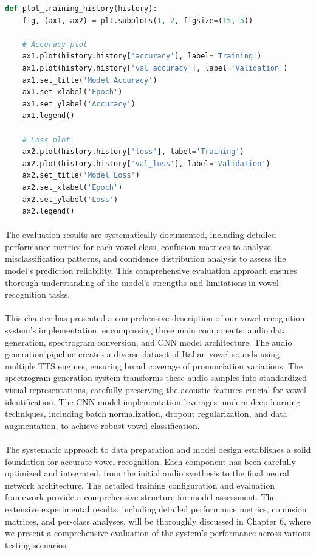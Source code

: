 \begin{lstlisting}[language=Python, caption={Evaluation Visualization Code}]
def plot_training_history(history):
    fig, (ax1, ax2) = plt.subplots(1, 2, figsize=(15, 5))
    
    # Accuracy plot
    ax1.plot(history.history['accuracy'], label='Training')
    ax1.plot(history.history['val_accuracy'], label='Validation')
    ax1.set_title('Model Accuracy')
    ax1.set_xlabel('Epoch')
    ax1.set_ylabel('Accuracy')
    ax1.legend()
    
    # Loss plot
    ax2.plot(history.history['loss'], label='Training')
    ax2.plot(history.history['val_loss'], label='Validation')
    ax2.set_title('Model Loss')
    ax2.set_xlabel('Epoch')
    ax2.set_ylabel('Loss')
    ax2.legend()
\end{lstlisting}

\paragraph{}
The evaluation results are systematically documented, including detailed performance metrics for each vowel class, confusion matrices to analyze misclassification patterns, and confidence distribution analysis to assess the model's prediction reliability. This comprehensive evaluation approach ensures thorough understanding of the model's strengths and limitations in vowel recognition tasks.


\paragraph{}
This chapter has presented a comprehensive description of our vowel recognition system's implementation, encompassing three main components: audio data generation, spectrogram conversion, and CNN model architecture. The audio generation pipeline creates a diverse dataset of Italian vowel sounds using multiple TTS engines, ensuring broad coverage of pronunciation variations. The spectrogram generation system transforms these audio samples into standardized visual representations, carefully preserving the acoustic features crucial for vowel identification. The CNN model implementation leverages modern deep learning techniques, including batch normalization, dropout regularization, and data augmentation, to achieve robust vowel classification.

\paragraph{}
The systematic approach to data preparation and model design establishes a solid foundation for accurate vowel recognition. Each component has been carefully optimized and integrated, from the initial audio synthesis to the final neural network architecture. The detailed training configuration and evaluation framework provide a comprehensive structure for model assessment. The extensive experimental results, including detailed performance metrics, confusion matrices, and per-class analyses, will be thoroughly discussed in Chapter 6, where we present a comprehensive evaluation of the system's performance across various testing scenarios.

